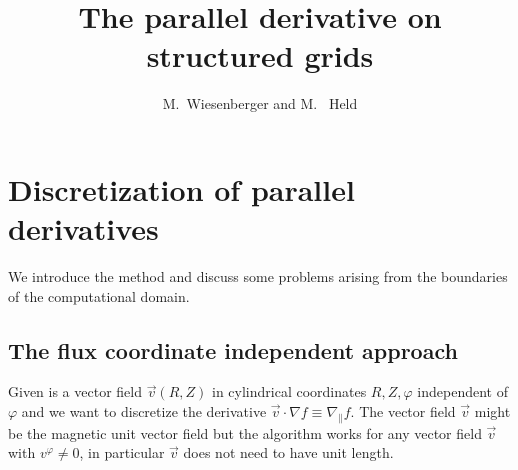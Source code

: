 


\newcommand{\RR}{{\rho}}
\newcommand{\ZZ}{{\zeta}}
\newcommand{\PP}{{\Phi}}




\title{The parallel derivative on structured grids}
\author{M.~Wiesenberger and M.~ Held}

\maketitle

\tableofcontents
\section{Discretization of parallel derivatives} \label{sec:parallel}
We introduce the method
and discuss some problems arising from the boundaries of the computational domain.

\subsection{The flux coordinate independent approach} \label{sec:parallela}
Given is a vector field $\vec v(R,Z)$ in cylindrical coordinates $R,Z,\varphi$ independent of $\varphi$ and we want to
discretize the derivative $\vec v \cdot\nabla f \equiv \nabla_\parallel f$.
The vector field $\vec v$ might be the magnetic unit vector field but the algorithm works
for any vector field $\vec v$ with $v^\varphi\neq 0$, in particular $\vec v$ does not need
to have unit length.

